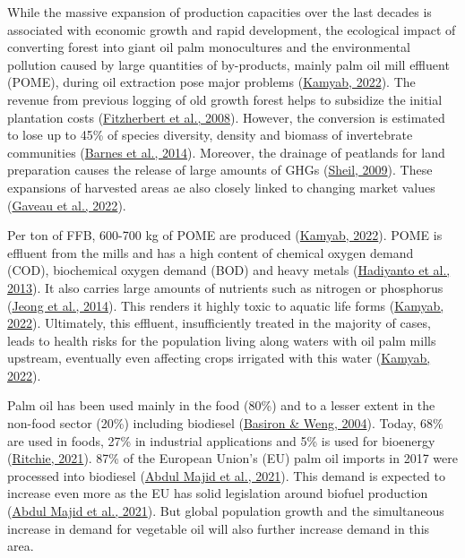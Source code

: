 \documentclass[
  letterpaper,
  DIV=11,
  numbers=noendperiod]{scrreprt}
\begin{document}
While the massive expansion of production capacities over the last
decades is associated with economic growth and rapid development, the
ecological impact of converting forest into giant oil palm monocultures
and the environmental pollution caused by large quantities of
by-products, mainly palm oil mill effluent (POME), during oil extraction
pose major problems
(\protect\hyperlink{ref-kamyabElaeisGuineensis2022}{Kamyab, 2022}). The
revenue from previous logging of old growth forest helps to subsidize
the initial plantation costs
(\protect\hyperlink{ref-fitzherbertHowWillOil2008}{Fitzherbert et al.,
2008}). However, the conversion is estimated to lose up to 45\% of
species diversity, density and biomass of invertebrate communities
(\protect\hyperlink{ref-barnesConsequencesTropicalLand2014}{Barnes et
al., 2014}). Moreover, the drainage of peatlands for land preparation
causes the release of large amounts of GHGs
(\protect\hyperlink{ref-sheilImpactsOpportunitiesOil2009}{Sheil, 2009}).
These expansions of harvested areas ae also closely linked to changing
market values
(\protect\hyperlink{ref-gaveauSlowingDeforestationIndonesia2022}{Gaveau
et al., 2022}).

Per ton of FFB, 600-700 kg of POME are produced
(\protect\hyperlink{ref-kamyabElaeisGuineensis2022}{Kamyab, 2022}). POME
is effluent from the mills and has a high content of chemical oxygen
demand (COD), biochemical oxygen demand (BOD) and heavy metals
(\protect\hyperlink{ref-hadiyantoPhytoremediationsPalmOil2013}{Hadiyanto
et al., 2013}). It also carries large amounts of nutrients such as
nitrogen or phosphorus
(\protect\hyperlink{ref-jeongPerformanceComparisonMesophilic2014}{Jeong
et al., 2014}). This renders it highly toxic to aquatic life forms
(\protect\hyperlink{ref-kamyabElaeisGuineensis2022}{Kamyab, 2022}).
Ultimately, this effluent, insufficiently treated in the majority of
cases, leads to health risks for the population living along waters with
oil palm mills upstream, eventually even affecting crops irrigated with
this water (\protect\hyperlink{ref-kamyabElaeisGuineensis2022}{Kamyab,
2022}).

Palm oil has been used mainly in the food (80\%) and to a lesser extent
in the non-food sector (20\%) including biodiesel
(\protect\hyperlink{ref-basironOILPALMITS2004}{Basiron \& Weng, 2004}).
Today, 68\% are used in foods, 27\% in industrial applications and 5\%
is used for bioenergy
(\protect\hyperlink{ref-ritchiePalmOil2021}{Ritchie, 2021}). 87\% of the
European Union's (EU) palm oil imports in 2017 were processed into
biodiesel
(\protect\hyperlink{ref-abdulmajidSustainablePalmOil2021}{Abdul Majid et
al., 2021}). This demand is expected to increase even more as the EU has
solid legislation around biofuel production
(\protect\hyperlink{ref-abdulmajidSustainablePalmOil2021}{Abdul Majid et
al., 2021}). But global population growth and the simultaneous increase
in demand for vegetable oil will also further increase demand in this
area.
\end{document}
